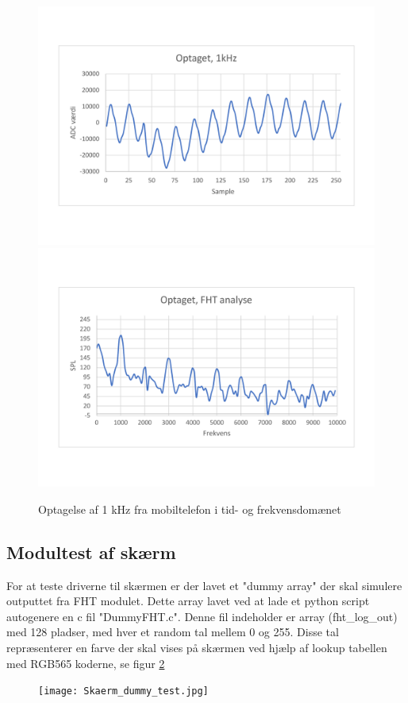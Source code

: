\begin{figure}[H] 
	\begin{center}
		\includegraphics[width=.45\linewidth, trim={0, 2.5cm, 1.8cm, 0}, clip]{Figur/rec_time_plot.pdf}\quad\includegraphics[width=.45\linewidth, trim={1.8cm, 2.5cm, 0cm, 0}, clip]{Figur/rec_FHT_plot}\quad
		\caption{Optagelse af 1 kHz fra mobiltelefon i tid- og frekvensdomænet }
		\label{fig:rec_plot}
	\end{center}
\end{figure}

\subsection{Modultest af skærm}
For at teste driverne til skærmen er der lavet et "dummy array" der skal simulere outputtet fra FHT modulet. Dette array lavet ved at lade et python script autogenere en c fil "DummyFHT.c". Denne fil indeholder er array (fht\_log\_out) med 128 pladser, med hver et random tal mellem 0 og 255. Disse tal repræsenterer en farve der skal vises på skærmen ved hjælp af lookup tabellen med RGB565 koderne, se figur \ref{fig:Skaerm_dummy_test}

\begin{figure} [H]
	\centering
	\texttt{[image: Skaerm\_dummy\_test.jpg]}
	\label{fig:Skaerm_dummy_test}
\end{figure}

